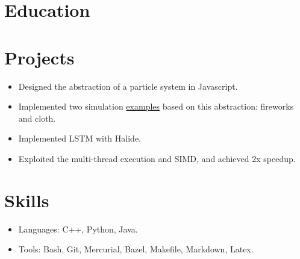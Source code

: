 \documentclass[letterpaper,11pt]{article}
\begin{document}
\section*{Education}
\begin{itemize}
\end{itemize}

\section*{Projects}

\begin{itemize}
  \begin{itemize}
  \item Designed the abstraction of a particle system in Javascript.
  \item Implemented two simulation \href{https://misaka-10032.github.io/particle-system/}{examples} based on this abstraction: fireworks and cloth.
  \end{itemize}
  \begin{itemize}
  \item Implemented LSTM with Halide.
  \item Exploited the multi-thread execution and SIMD, and achieved 2x speedup.
  \end{itemize}
\end{itemize}

\section*{Skills}
\begin{itemize}
\item Languages: C++, Python, Java.
\item Tools: Bash, Git, Mercurial, Bazel, Makefile, Markdown, Latex.
\end{itemize}
\end{document}
